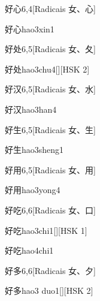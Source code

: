 \begin{entry}{好心}{6,4}[Radicais ⼥、⼼]
  \begin{phonetics}{好心}{hao3xin1}
  \end{phonetics}
\end{entry}

\begin{entry}{好处}{6,5}[Radicais ⼥、⼡]
  \begin{phonetics}{好处}{hao3chu4}[][HSK 2]
  \end{phonetics}
\end{entry}

\begin{entry}{好汉}{6,5}[Radicais ⼥、⽔]
  \begin{phonetics}{好汉}{hao3han4}
  \end{phonetics}
\end{entry}

\begin{entry}{好生}{6,5}[Radicais ⼥、⽣]
  \begin{phonetics}{好生}{hao3sheng1}
  \end{phonetics}
\end{entry}

\begin{entry}{好用}{6,5}[Radicais ⼥、⽤]
  \begin{phonetics}{好用}{hao3yong4}
  \end{phonetics}
\end{entry}

\begin{entry}{好吃}{6,6}[Radicais ⼥、⼝]
  \begin{phonetics}{好吃}{hao3chi1}[][HSK 1]
  \end{phonetics}
  \begin{phonetics}{好吃}{hao4chi1}
  \end{phonetics}
\end{entry}

\begin{entry}{好多}{6,6}[Radicais ⼥、⼣]
  \begin{phonetics}{好多}{hao3 duo1}[][HSK 2]
  \end{phonetics}
\end{entry}

